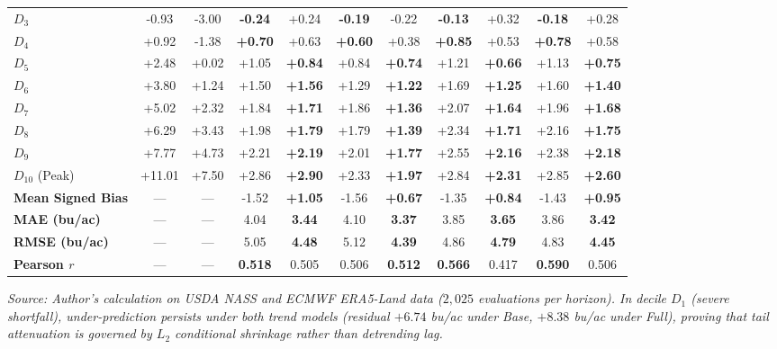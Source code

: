\begin{table}[htbp]
\begin{tabular*}{\textwidth}{@{\extracolsep{\fill}} l cc cc cc cc cc @{}}
$D_{3}$ & -0.93 & -3.00 & \textbf{-0.24} & +0.24 & \textbf{-0.19} & -0.22 & \textbf{-0.13} & +0.32 & \textbf{-0.18} & +0.28 \\
$D_{4}$ & +0.92 & -1.38 & \textbf{+0.70} & +0.63 & \textbf{+0.60} & +0.38 & \textbf{+0.85} & +0.53 & \textbf{+0.78} & +0.58 \\
$D_{5}$ & +2.48 & +0.02 & +1.05 & \textbf{+0.84} & +0.84 & \textbf{+0.74} & +1.21 & \textbf{+0.66} & +1.13 & \textbf{+0.75} \\
$D_{6}$ & +3.80 & +1.24 & +1.50 & \textbf{+1.56} & +1.29 & \textbf{+1.22} & +1.69 & \textbf{+1.25} & +1.60 & \textbf{+1.40} \\
$D_{7}$ & +5.02 & +2.32 & +1.84 & \textbf{+1.71} & +1.86 & \textbf{+1.36} & +2.07 & \textbf{+1.64} & +1.96 & \textbf{+1.68} \\
$D_{8}$ & +6.29 & +3.43 & +1.98 & \textbf{+1.79} & +1.79 & \textbf{+1.39} & +2.34 & \textbf{+1.71} & +2.16 & \textbf{+1.75} \\
$D_{9}$ & +7.77 & +4.73 & +2.21 & \textbf{+2.19} & +2.01 & \textbf{+1.77} & +2.55 & \textbf{+2.16} & +2.38 & \textbf{+2.18} \\
$D_{10}$ (Peak) & +11.01 & +7.50 & +2.86 & \textbf{+2.90} & +2.33 & \textbf{+1.97} & +2.84 & \textbf{+2.31} & +2.85 & \textbf{+2.60} \\
\midrule
\textbf{Mean Signed Bias} & --- & --- & -1.52 & \textbf{+1.05} & -1.56 & \textbf{+0.67} & -1.35 & \textbf{+0.84} & -1.43 & \textbf{+0.95} \\
\textbf{MAE (bu/ac)} & --- & --- & 4.04 & \textbf{3.44} & 4.10 & \textbf{3.37} & 3.85 & \textbf{3.65} & 3.86 & \textbf{3.42} \\
\textbf{RMSE (bu/ac)} & --- & --- & 5.05 & \textbf{4.48} & 5.12 & \textbf{4.39} & 4.86 & \textbf{4.79} & 4.83 & \textbf{4.45} \\
\textbf{Pearson $r$} & --- & --- & \textbf{0.518} & 0.505 & 0.506 & \textbf{0.512} & \textbf{0.566} & 0.417 & \textbf{0.590} & 0.506 \\
\bottomrule
\end{tabular*}
\vspace{0.2em}
{\footnotesize \textit{Source: Author's calculation on USDA NASS and ECMWF ERA5-Land data ($2{,}025$ evaluations per horizon). In decile $D_1$ (severe shortfall), under-prediction persists under both trend models (residual $+6.74$ bu/ac under Base, $+8.38$ bu/ac under Full), proving that tail attenuation is governed by $L_2$ conditional shrinkage rather than detrending lag.}}
\end{table}